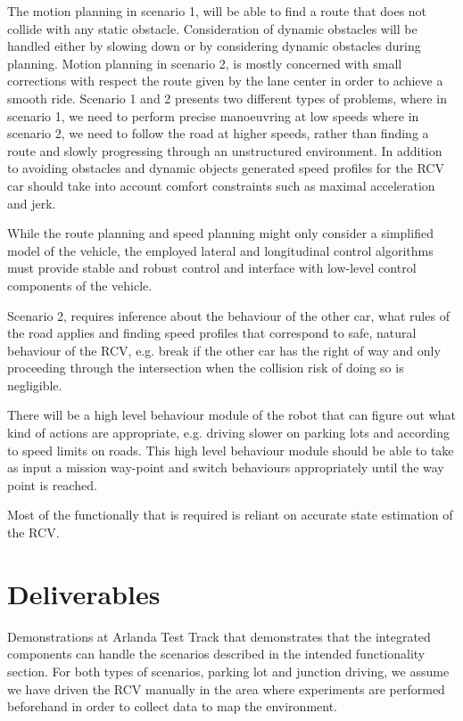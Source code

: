 \documentclass[11pt,a4paper]{article}
\begin{document}
The motion planning in scenario 1, will be able to find a
route that does not collide with any static obstacle. Consideration
of dynamic obstacles will be handled either by slowing down or by
considering dynamic obstacles during planning. Motion planning in
scenario 2, is mostly concerned with small corrections with respect
the route given by the lane center in order to achieve a smooth
ride. Scenario 1 and 2 presents two different types of problems,
where in scenario 1, we need to perform precise manoeuvring at low
speeds where in scenario 2, we need to follow the road at higher speeds, rather than finding a route and slowly progressing through an unstructured environment. In addition to avoiding obstacles
and dynamic objects generated speed profiles for the RCV car should
take into account comfort constraints such as maximal acceleration and
jerk.

While the route planning and speed planning might only consider a
simplified model of the vehicle, the employed lateral and longitudinal
control algorithms must provide stable and robust control and interface
with low-level control components of the vehicle.

Scenario 2, requires inference about the behaviour of the other car,
what rules of the road applies and finding speed profiles that
correspond to safe, natural behaviour of the RCV, e.g. break if the
other car has the right of way and only proceeding through the
intersection when the collision risk of doing so is negligible.

There will be a high level behaviour module of the robot that
can figure out what kind of actions are appropriate, e.g. driving
slower on parking lots and according to speed limits on roads. This
high level behaviour module should be able to take as input a mission
way-point and switch behaviours appropriately until the way point is
reached.

Most of the functionally that is required is reliant on accurate
state estimation of the RCV.

\section{Deliverables}

Demonstrations at Arlanda Test Track that demonstrates that the integrated
components can handle the scenarios described in the intended
functionality section. For both types of scenarios, parking lot and junction driving, we assume we have driven the RCV manually
in the area where experiments are performed beforehand in order to
collect data to map the environment.
\end{document}
